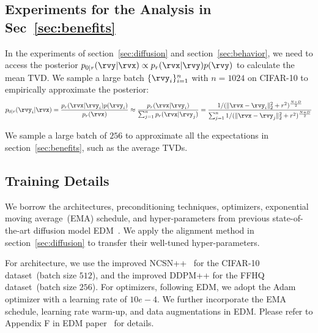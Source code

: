 \subsection{Experiments for the Analysis in Sec~\ref{sec:benefits}}
\label{app:be-exp}
In the experiments of section~\ref{sec:diffusion} and section~\ref{sec:behavior}, we need to access the posterior $p_{0|r}(\rvy|\rvx)\propto p_r(\rvx|\rvy)p(\rvy)$ to calculate the mean TVD. We sample a large batch $\{\rvy_i\}_{i=1}^n$ with $n=1024$ on CIFAR-10 to empirically approximate the posterior:
\begin{align*}
    p_{0|r}(\rvy_i|\rvx) = \frac{p_r(\rvx|\rvy_i)p(\rvy_i)}{p_r(\rvx)}\approx \frac{p_r(\rvx|\rvy_i)}{\sum_{j=1}^n p_r(\rvx|\rvy_j)}=\frac{{1}/{({\|\rvx-{\rvy_i}\|_2^2+ r^2})^\frac{N+D}{2}}}{\sum_{j=1}^n {1}/{({\|\rvx-{\rvy_j}\|_2^2+ r^2})^\frac{N+D}{2}}}
\end{align*}

We sample a large batch of $256$ to approximate all the expectations in section~\ref{sec:benefits}, such as the average TVDs.
\subsection{Training Details}

We borrow the architectures, preconditioning techniques, optimizers, exponential moving average~(EMA) schedule, and hyper-parameters from previous state-of-the-art diffusion model EDM~\cite{Karras2022ElucidatingTD}. We apply the alignment method in section~\ref{sec:diffusion} to transfer their well-tuned hyper-parameters. 

For architecture, we use the improved NCSN++~\cite{Karras2022ElucidatingTD} for the CIFAR-10 dataset~(batch size $512$), and the improved DDPM++ for the FFHQ dataset~(batch size $256$). For optimizers, following EDM, we adopt the Adam optimizer with a learning rate of $10e-4$. We further incorporate the EMA schedule, learning rate warm-up, and data augmentations in EDM. Please refer to Appendix F in EDM paper~\cite{Karras2022ElucidatingTD} for details.

